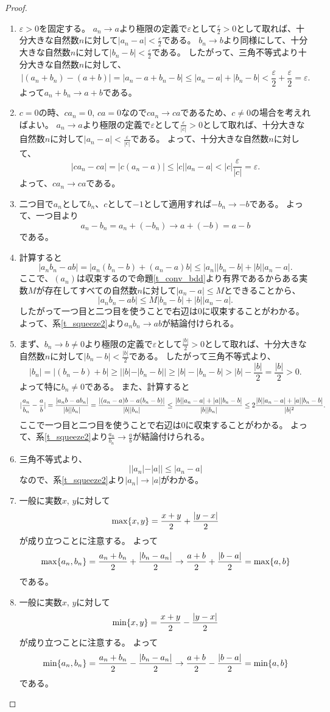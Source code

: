 \begin{proof}
\begin{enumerate}
\item
$\varepsilon > 0$を固定する。
$a_n \to a$より極限の定義で$\varepsilon$として$\frac{\varepsilon}{2} > 0$として取れば、十分大きな自然数$n$に対して$|a_n-a| < \frac{\varepsilon}{2}$である。
$b_n \to b$より同様にして、十分大きな自然数$n$に対して$|b_n-b| < \frac{\varepsilon}{2}$である。
したがって、三角不等式より十分大きな自然数$n$に対して、
$$
|(a_n+b_n)-(a+b)| = |a_n-a+b_n-b| \le |a_n-a|+|b_n-b| < \frac{\varepsilon}{2}+\frac{\varepsilon}{2} = \varepsilon.
$$
よって$a_n+b_n \to a+b$である。
\item
$c = 0$の時、$c a_n = 0$, $c a = 0$なので$c a_n \to c a$であるため、$c \ne 0$の場合を考えればよい。
$a_n \to a$より極限の定義で$\varepsilon$として$\frac{\varepsilon}{|c|} > 0$として取れば、十分大きな自然数$n$に対して$|a_n-a| < \frac{\varepsilon}{|c|}$である。
よって、十分大きな自然数$n$に対して、
$$
|c a_n-c a| = |c(a_n-a)| \le |c||a_n-a| < |c|\frac{\varepsilon}{|c|} = \varepsilon.
$$
よって、$c a_n \to c a$である。
\item
二つ目で$a_n$として$b_n$、$c$として$-1$として適用すれば$-b_n \to -b$である。
よって、一つ目より
$$
a_n-b_n = a_n+(-b_n) \to a+(-b) = a-b
$$
である。
\item
計算すると
$$
|a_n b_n-a b| = |a_n(b_n-b)+(a_n-a)b| \le |a_n||b_n-b|+|b||a_n-a|.
$$
ここで、$(a_n)$は収束するので命題\ref{t_conv_bdd}より有界であるからある実数$M$が存在してすべての自然数$n$に対して$|a_n-a| \le M$とできることから、
$$
|a_n b_n-a b| \le M|b_n-b|+|b||a_n-a|.
$$
したがって一つ目と二つ目を使うことで右辺は$0$に収束することがわかる。
よって、系\ref{t_squeeze2}より$a_n b_n \to a b$が結論付けられる。
\item
まず、$b_n \to b \ne 0$より極限の定義で$\varepsilon$として$\frac{|b|}{2} > 0$として取れば、十分大きな自然数$n$に対して$|b_n-b| < \frac{|b|}{2}$である。
したがって三角不等式より、
$$
|b_n| = |(b_n-b)+b| \ge ||b|-|b_n-b|| \ge |b|-|b_n-b| > |b|-\frac{|b|}{2} = \frac{|b|}{2} > 0.
$$
よって特に$b_n \ne 0$である。
また、計算すると
$$
\lvert\frac{a_n}{b_n}-\frac{a}{b}\rvert = \frac{|a_n b-a b_n|}{|b||b_n|} = \frac{|(a_n-a)b-a(b_n-b)|}{|b||b_n|} \le \frac{|b||a_n-a|+|a||b_n-b|}{|b||b_n|} \le 2\frac{|b||a_n-a|+|a||b_n-b|}{|b|^2}.
$$
ここで一つ目と二つ目を使うことで右辺は$0$に収束することがわかる。
よって、系\ref{t_squeeze2}より$\frac{a_n}{b_n} \to \frac{a}{b}$が結論付けられる。
\item
三角不等式より、
$$
||a_n|-|a|| \le |a_n-a|
$$
なので、系\ref{t_squeeze2}より$|a_n| \to |a|$がわかる。
\item
一般に実数$x$, $y$に対して
$$
\max\{ x, y \} = \frac{x+y}{2}+\frac{|y-x|}{2}
$$
が成り立つことに注意する。
よって
$$
\max\{ a_n, b_n \} = \frac{a_n+b_n}{2}+\frac{|b_n-a_n|}{2} \to \frac{a+b}{2}+\frac{|b-a|}{2} = \max\{ a, b \}
$$
である。
\item
一般に実数$x$, $y$に対して
$$
\min\{ x, y \} = \frac{x+y}{2}-\frac{|y-x|}{2}
$$
が成り立つことに注意する。
よって
$$
\min\{ a_n, b_n \} = \frac{a_n+b_n}{2}-\frac{|b_n-a_n|}{2} \to \frac{a+b}{2}-\frac{|b-a|}{2} = \min\{ a, b \}
$$
である。
\end{enumerate}
\end{proof}

